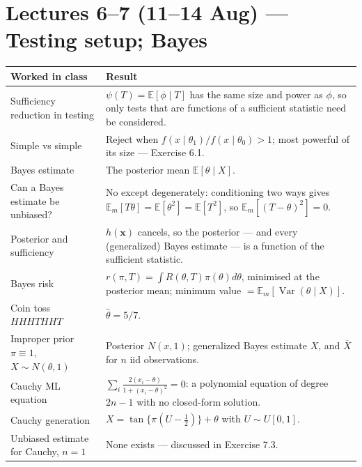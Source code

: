 \documentclass[11pt]{article}
\newcommand{\E}{\mathbb{E}}
\newcommand{\Var}{\operatorname{Var}}
\newcommand{\Xbar}{\overline{X}}
\newcounter{exc}[section]
\begin{document}
\section*{Lectures 6--7 (11--14 Aug) --- Testing setup; Bayes}
\begin{longtable}{@{}p{7.2cm}p{9.0cm}@{}}
\toprule
\textbf{Worked in class} & \textbf{Result} \\
\midrule
Sufficiency reduction in testing &
$\psi(T)=\E[\phi\mid T]$ has the same size and power as $\phi$, so only tests that are
functions of a sufficient statistic need be considered. \\
Simple vs simple &
Reject when $f(x\mid\theta_1)/f(x\mid\theta_0)>1$; most powerful of its size --- Exercise 6.1. \\
Bayes estimate & The posterior mean $\E[\theta\mid X]$. \\
Can a Bayes estimate be unbiased? &
No except degenerately: conditioning two ways gives $\E_m[T\theta]=\E[\theta^2]=\E[T^2]$,
so $\E_m[(T-\theta)^2]=0$. \\
Posterior and sufficiency &
$h(\mathbf x)$ cancels, so the posterior --- and every (generalized) Bayes estimate --- is a
function of the sufficient statistic. \\
Bayes risk & $r(\pi,T)=\int R(\theta,T)\pi(\theta)d\theta$, minimised at the posterior mean;
minimum value $=\E_m[\Var(\theta\mid X)]$. \\
Coin toss $HHHTHHT$ & $\hat\theta=5/7$. \\
Improper prior $\pi\equiv1$, $X\sim N(\theta,1)$ &
Posterior $N(x,1)$; generalized Bayes estimate $X$, and $\Xbar$ for $n$ iid observations. \\
Cauchy ML equation &
$\sum_i\frac{2(x_i-\theta)}{1+(x_i-\theta)^2}=0$: a polynomial equation of degree $2n-1$
with no closed-form solution. \\
Cauchy generation & $X=\tan\{\pi(U-\tfrac12)\}+\theta$ with $U\sim U[0,1]$. \\
Unbiased estimate for Cauchy, $n=1$ & None exists --- discussed in Exercise 7.3. \\
\bottomrule
\end{longtable}
\end{document}
